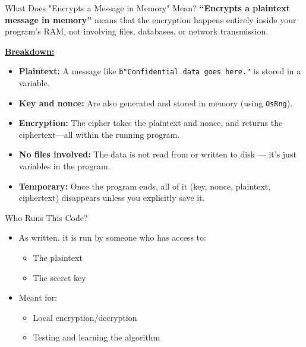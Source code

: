 \documentclass{beamer}
\begin{document}
\begin{frame}[t]{What Does "Encrypts a Message in Memory" Mean?}
		\textbf{``Encrypts a plaintext message in memory''} means that the encryption happens entirely inside your program's RAM, not involving files, databases, or network transmission.
		
		\vspace{0.3em}
		\textbf{\underline{Breakdown:}}
		\begin{itemize}
			\item \textbf{Plaintext:} A message like \texttt{b"Confidential data goes here."} is stored in a variable.
			\item \textbf{Key and nonce:} Are also generated and stored in memory (using \texttt{OsRng}).
			\item \textbf{Encryption:} The cipher takes the plaintext and nonce, and returns the ciphertext—all within the running program.
			\item \textbf{No files involved:} The data is not read from or written to disk — it's just variables in the program.
			\item \textbf{Temporary:} Once the program ends, all of it (key, nonce, plaintext, ciphertext) disappears unless you explicitly save it.
		\end{itemize}
	\end{frame}
	\begin{frame}[t]{Who Runs This Code?}
		\begin{itemize}
			\item As written, it is run by someone who has access to:
			\begin{itemize}
				\item The plaintext
				\item The secret key
			\end{itemize}
			\item Meant for:
			\begin{itemize}
				\item Local encryption/decryption
				\item Testing and learning the algorithm
			\end{itemize}
		\end{itemize}
	\end{frame}
	
\end{document}
